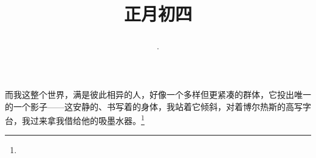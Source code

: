 \title{\date[d=13,m=2,y=2024][year:cn-y,年,month:cn,day:cn,日,·,weekday]·正月初四 }
而我这整个世界，满是彼此相异的人，好像一个多样但更紧凑的群体，它投出唯一的一个影子——这安静的、书写着的身体，我站着它倾斜，对着博尔热斯的高写字台，我过来拿我借给他的吸墨水器。\footnote{ }

